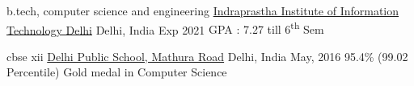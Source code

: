

\begin{cventries}
  \cventry
    {b.tech, computer science and engineering}
    {\href{http://iiitd.ac.in/}{Indraprastha Institute of Information Technology Delhi}}
    {Delhi, India}
    {Exp 2021}
    {GPA : 7.27 till 6\textsuperscript{th} Sem}
    {}

  \cventry
    {cbse xii}
    {\href{https://dpsmathuraroad.org/}{Delhi Public School, Mathura Road}}
    {Delhi, India}
    {May, 2016}
    {95.4\% (99.02 Percentile)\newline
    Gold medal in Computer Science   
    }
    {}

\end{cventries}